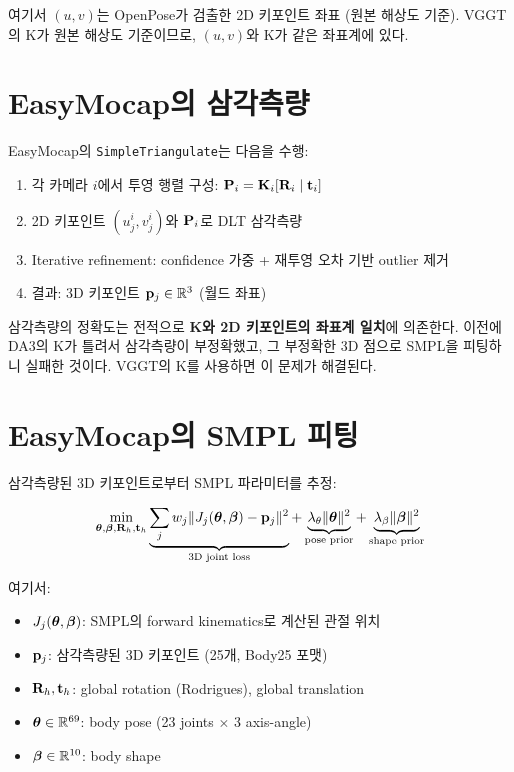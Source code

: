 \documentclass[11pt, a4paper]{report}
\begin{document}
여기서 $(u, v)$는 OpenPose가 검출한 2D 키포인트 좌표 (원본 해상도 기준).
VGGT의 K가 원본 해상도 기준이므로, $(u, v)$와 K가 같은 좌표계에 있다.


\section{EasyMocap의 삼각측량}

EasyMocap의 \texttt{SimpleTriangulate}는 다음을 수행:

\begin{enumerate}[leftmargin=*]
  \item 각 카메라 $i$에서 투영 행렬 구성: $\mathbf{P}_i = \mathbf{K}_i [\mathbf{R}_i \mid \mathbf{t}_i]$
  \item 2D 키포인트 $(u_j^i, v_j^i)$와 $\mathbf{P}_i$로 DLT 삼각측량
  \item Iterative refinement: confidence 가중 + 재투영 오차 기반 outlier 제거
  \item 결과: 3D 키포인트 $\mathbf{p}_j \in \mathbb{R}^3$ (월드 좌표)
\end{enumerate}

\begin{importantnote}
삼각측량의 정확도는 전적으로 \textbf{K와 2D 키포인트의 좌표계 일치}에 의존한다.
이전에 DA3의 K가 틀려서 삼각측량이 부정확했고, 그 부정확한 3D 점으로 SMPL을 피팅하니 실패한 것이다.
VGGT의 K를 사용하면 이 문제가 해결된다.
\end{importantnote}


\section{EasyMocap의 SMPL 피팅}

삼각측량된 3D 키포인트로부터 SMPL 파라미터를 추정:

\begin{equation}
\min_{\bm{\theta}, \bm{\beta}, \mathbf{R}_h, \mathbf{t}_h} \underbrace{\sum_{j} w_j \| J_j(\bm{\theta}, \bm{\beta}) - \mathbf{p}_j \|^2}_{\text{3D joint loss}}
+ \underbrace{\lambda_\theta \|\bm{\theta}\|^2}_{\text{pose prior}}
+ \underbrace{\lambda_\beta \|\bm{\beta}\|^2}_{\text{shape prior}}
\end{equation}

여기서:
\begin{itemize}[leftmargin=*]
  \item $J_j(\bm{\theta}, \bm{\beta})$: SMPL의 forward kinematics로 계산된 관절 위치
  \item $\mathbf{p}_j$: 삼각측량된 3D 키포인트 (25개, Body25 포맷)
  \item $\mathbf{R}_h, \mathbf{t}_h$: global rotation (Rodrigues), global translation
  \item $\bm{\theta} \in \mathbb{R}^{69}$: body pose (23 joints $\times$ 3 axis-angle)
  \item $\bm{\beta} \in \mathbb{R}^{10}$: body shape
\end{itemize}
\end{document}
